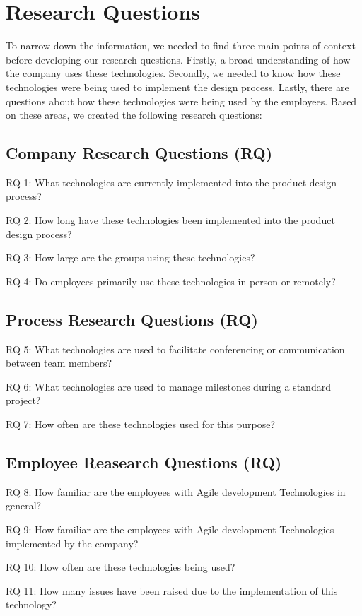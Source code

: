\documentclass[conference]{IEEEtran}
\begin{document}
\section{Research Questions}
To narrow down the information, we needed to find three main points of context before developing our research questions. Firstly, a broad understanding of how the company uses these technologies.  Secondly, we needed to know how these technologies were being used to implement the design process. Lastly, there are questions about how these technologies were being used by the employees. Based on these areas, we created the following research questions: 

\subsection*{Company Research Questions (RQ) }
RQ 1: What technologies are currently implemented into the product design process? 

RQ 2: How long have these technologies been implemented into the product design process? 

RQ 3: How large are the groups using these technologies? 

RQ 4: Do employees primarily use these technologies in-person or remotely? 

\subsection*{Process Research Questions (RQ)  }
RQ 5: What technologies are used to facilitate conferencing or communication between team members? 

RQ 6: What technologies are used to manage milestones during a standard project? 

RQ 7: How often are these technologies used for this purpose? 

\subsection*{Employee Reasearch Questions (RQ)  }
RQ  8: How familiar are the employees with Agile development Technologies in general? 

RQ 9: How familiar are the employees with Agile development Technologies implemented by the company? 

RQ 10: How often are these technologies being used? 

RQ 11: How many issues have been raised due to the implementation of this technology? 
\end{document}
